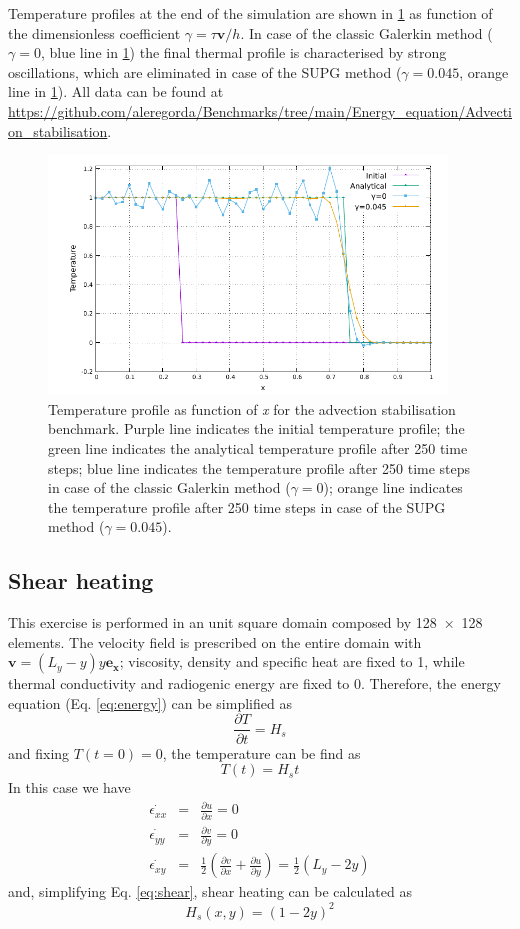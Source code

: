 \documentclass[hidelinks,10pt,a4paper]{article}
\begin{document}
Temperature profiles at the end of the simulation are shown in \ref{fig:advection} as function of the dimensionless coefficient $\gamma=\tau \bm{v}/h$. In case
of the classic Galerkin method ($\gamma=0$, blue line in \ref{fig:advection}) the final thermal profile is characterised by strong oscillations, which are
eliminated in case of the SUPG method ($\gamma=0.045$, orange line in \ref{fig:advection}). 
All data can be found at \url{https://github.com/aleregorda/Benchmarks/tree/main/Energy_equation/Advection_stabilisation}.

\begin{figure}
\centering
\noindent\includegraphics[width=400px]{./Figures/Advection.pdf}
\caption{Temperature profile as function of \textit{x} for the advection stabilisation benchmark. Purple line indicates the initial temperature profile; the
green line indicates the analytical temperature profile after 250 time steps; blue line indicates the temperature profile after 250 time steps in case of the
classic Galerkin method ($\gamma=0$); orange line indicates the temperature profile after 250 time steps in case of the SUPG method ($\gamma=0.045$).}
\label{fig:advection}
\end{figure}

\subsection{Shear heating}\label{sec:simple_shear}
This exercise is performed in an unit square domain composed by \num{128x128} elements. The velocity field is prescribed on the entire domain with
$\bm{v}=(L_y-y)y\bm{e_x}$; viscosity, density and specific heat are fixed to 1, while thermal conductivity and radiogenic energy are fixed to 0. Therefore,
the energy equation (Eq. \ref{eq:energy}) can be simplified as \[\frac{\partial T}{\partial t}=H_s\] and fixing $T(t=0)=0$, the temperature can be find as
\[T(t)=H_s t\]
In this case we have
\begin{eqnarray}
\dot{\epsilon_{xx}}&=&\frac{\partial u}{\partial x}=0 \nonumber \\
\dot{\epsilon_{yy}}&=&\frac{\partial v}{\partial y}=0 \nonumber \\
\dot{\epsilon_{xy}}&=&\frac{1}{2}\left(\frac{\partial v}{\partial x}+\frac{\partial u}{\partial y}\right)=\frac{1}{2}(L_y-2y)\nonumber
\end{eqnarray}
and, simplifying Eq. \ref{eq:shear}, shear heating can be calculated as \[H_s(x,y)=(1-2y)^2\]
\end{document}
